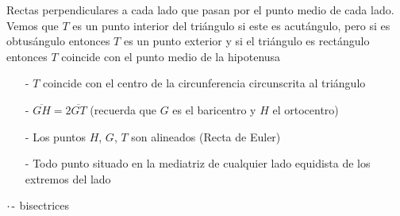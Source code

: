 \noindent\parbox[][][t]{.3\linewidth}{
    
}
\parbox[][][t]{.05\linewidth}{\hspace{.03\linewidth}}
\parbox[][][t]{.65\linewidth}{
 Rectas perpendiculares a cada lado que pasan por el punto medio de cada lado. Vemos que $T$ es un punto interior del triángulo si este es acutángulo, pero si es obtusángulo entonces $T$ es un punto exterior y si el triángulo es rectángulo entonces $T$ coincide con el punto medio de la hipotenusa
 
}

\begin{itemize}
     \item[-] $T$ coincide con el centro de la circunferencia circunscrita al triángulo
     \item[-] $\overline{GH} = 2\overline{GT}$ (recuerda que $G$ es el baricentro y $H$ el ortocentro)
     \item[-] Los puntos $H$, $G$, $T$ son alineados (Recta de Euler)
     \item[-] Todo punto situado en la mediatriz de cualquier lado equidista de los extremos del lado
 \end{itemize}
 
 \vspace{0.5cm}
 $\cdot\hspace{0.05cm}\text{-}$ bisectrices

